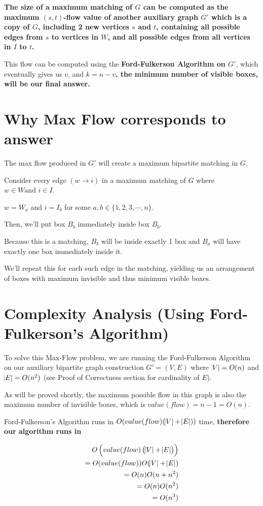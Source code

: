 \documentclass{article}
\begin{document}
\textbf{The size of a maximum matching of $G$ can be computed as the maximum $(s,t)$-flow value of another auxiliary graph $G'$ which is a copy of $G$, including 2 new vertices $s$ and $t$, containing all possible edges from $s$ to vertices in $W$, and all possible edges from all vertices in $I$ to $t$.}

This flow can be computed using the \textbf{Ford-Fulkerson Algorithm on $G'$}, which eventually gives us $v$, and \textbf{$k = n-v$, the minimum number of visible boxes, will be our final answer.}

\section{Why Max Flow corresponds to answer}

The max flow produced in $G'$ will create a maximum bipartite matching in $G$.

Consider every edge $(w \rightarrow i)$ in a maximum matching of $G$ where $w \in W \text{and } i \in I$.

$w = W_a$ and $i = I_b$ for some $a,b \in \{1,2,3,\cdots,n\}$.

Then, we'll put box $B_b$ immediately inside box $B_b$. 

Because this is a matching, $B_b$ will be inside exactly 1 box and $B_a$ will have exactly one box immediately inside it.

We'll repeat this for each such edge in the matching, yielding us an arrangement of boxes with maximum invisible and thus minimum visible boxes.


\section{Complexity Analysis (Using Ford-Fulkerson's Algorithm)}

To solve this Max-Flow problem, we are running the Ford-Fulkerson Algorithm on our auxiliary bipartite graph construction $G' = (V, E)$ where $\abs{V} = O(n)$ and $\abs{E} = O(n^2)$ (see Proof of Correctness section for cardinality of $E$).

As will be proved shortly, the maximum possible flow in this graph is also the maximum number of invisible boxes, which is $value(flow) = n-1 = O(n)$. 

Ford-Fulkerson's Algorithm runs in $O(value(flow)(\abs{V} + \abs{E}))$ time, \textbf{therefore our algorithm runs in}

    \begin{center}
    \begin{align*}
        O\left(value(flow)\left( \abs{V} + \abs{E} \right) \right) \\
        = O(value(flow)) O(\abs{V} + \abs{E}) \\
        = O(n) O(n + n^2) \\
        = O(n) O(n^2) \\
        = O(n^3) 
    \end{align*}
    \end{center}
\end{document}
